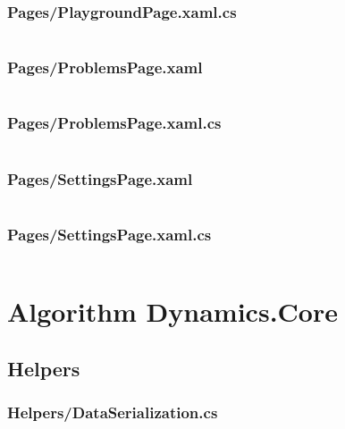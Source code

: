\documentclass[a4paper]{report}
\begin{document}
\inputminted{xml}{"../src/Algorithm Dynamics/Pages/PlaygroundPage.xaml"}

\subsubsection{Pages/PlaygroundPage.xaml.cs}

\inputminted{csharp}{"../src/Algorithm Dynamics/Pages/PlaygroundPage.xaml.cs"}

\subsubsection{Pages/ProblemsPage.xaml}
\label{subsubsec:problemspage}

\inputminted{xml}{"../src/Algorithm Dynamics/Pages/ProblemsPage.xaml"}

\subsubsection{Pages/ProblemsPage.xaml.cs}

\inputminted{csharp}{"../src/Algorithm Dynamics/Pages/ProblemsPage.xaml.cs"}

\subsubsection{Pages/SettingsPage.xaml}

\inputminted{xml}{"../src/Algorithm Dynamics/Pages/SettingsPage.xaml"}

\subsubsection{Pages/SettingsPage.xaml.cs}

\inputminted{csharp}{"../src/Algorithm Dynamics/Pages/SettingsPage.xaml.cs"}

\section{Algorithm Dynamics.Core}

\subsection{Helpers}

\subsubsection{Helpers/DataSerialization.cs}
\end{document}
